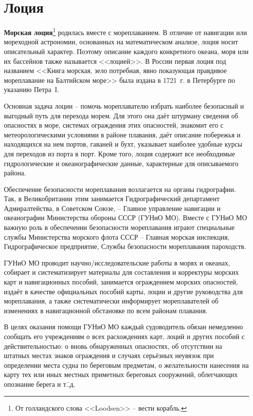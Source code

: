 \chapter{Лоция}

\textbf{Морская лоция}\footnote{От голландского слова <<Loodsen>> \---
  вести корабль.} родилась вместе с мореплаванием. В отличие от
навигации или мореходной астрономии, основанных на математическом
анализе, лоция носит описательный характер. Поэтому описание каждого
конкретного океана, моря или их бассейнов также называется
<<лоцией>>. В России первая лоция под названием <<Книга морская, зело
потребная, явно показующая правдивое мореплавание на Балтийском море>>
была издана в 1721~г. в Петербурге по указанию Петра~I.

Основная задача лоции \--- помочь мореплавателю избрать наиболее
безопасный и выгодный путь для перехода морем. Для этого она даёт
штурману сведения об опасностях в море, системах ограждения этих
опасностей, знакомит его с метеорологическими условиями в районе
плавания, даёт описание побережья и находящихся на нем портов, гаваней
и бухт, указывает наиболее удобные курсы для переходов из порта в
порт. Кроме того, лоция содержит все необходимые гидрологические и
океанографические данные, характерные для описываемого района.

Обеспечение безопасности мореплавания возлагается на органы
гидрографии. Так, в Великобритании этим занимается Гидрографический
департамент Адмиралтейства, в Советском Союзе, \--- Главное управление
навигации и океанографии Министерства обороны СССР (ГУНиО МО). Вместе
с ГУНиО МО важную роль в обеспечении безопасности мореплавания играют
специальные службы Министерства морского флота СССР \--- Главная
морская инспекция, Гидрографическое предприятие, Службы безопасности
мореплавания пароходств.

ГУНиО МО проводит научно\-/исследовательские работы в морях и океанах,
собирает и систематизирует материалы для составления и корректуры
морских карт и навигационных пособий, занимается ограждением морских
опасностей, издаёт в качестве официальных пособий карты, лоции и
другие руководства для мореплавания, а также систематически
информирует мореплавателей об изменениях в навигационной обстановке по
всем районам плавания.

В целях оказания помощи ГУНиО МО каждый судоводитель обязан немедленно
сообщать его учреждениям о всех расхождениях карт, лоций и других
пособий с действительностью: о вновь обнаруженных опасностях, об
отсутствии на штатных местах знаков ограждения и случаях серьёзных
неувязок при определении места судна по береговым предметам, о
желательности нанесения на карту тех или иных местных приметных
береговых сооружений, облегчающих опознание берега и т.\=,д.

